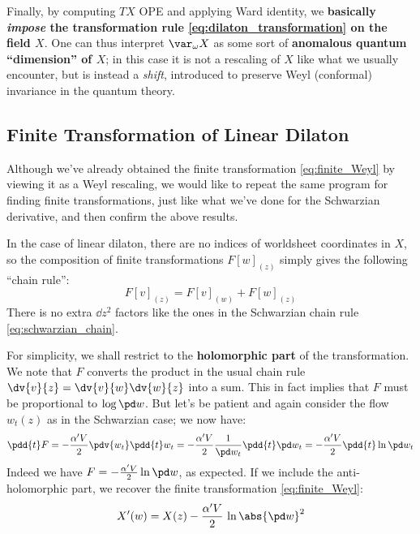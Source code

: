 \documentclass[a4paper
	,10pt
]{article}
\begin{document}
	Finally, by computing $TX$ OPE and applying Ward identity, we \textbf{basically \textit{impose} the transformation rule \eqref{eq:dilaton_transformation} on the field $X$}. One can thus interpret $\var_\omega X$ as some sort of \textbf{anomalous quantum ``dimension'' of $X$}; in this case it is not a rescaling of $X$ like what we usually encounter, but is instead a \textit{shift}, introduced to preserve Weyl (conformal) invariance in the quantum theory. 
	
\subsection{Finite Transformation of Linear Dilaton}
	Although we've already obtained the finite transformation \eqref{eq:finite_Weyl} by viewing it as a Weyl rescaling, we would like to repeat the same program for finding finite transformations, just like what we've done for the Schwarzian derivative, and then confirm the above results. 
	
	In the case of linear dilaton, there are no indices of worldsheet coordinates in $X$, so the composition of finite transformations $F[w]_{(z)}$ simply gives the following ``chain rule'':
	\begin{equation}
		F[v]_{(z)} = F[v]_{(w)} + F[w]_{(z)}
	\end{equation}
	There is no extra $\dd{z}^2$ factors like the ones in the Schwarzian chain rule \eqref{eq:schwarzian_chain}. 
	
	For simplicity, we shall restrict to the \textbf{holomorphic part} of the transformation.
	We note that $F$ converts the product in the usual chain rule $
		\dv{v}{z}
		= \dv{v}{w} \dv{w}{z} 
	$ into a sum. This in fact implies that $F$ must be proportional to $\log \pd w$. But let's be patient and again consider the flow $w_t(z)$ as in the Schwarzian case; we now have:
	\begin{equation}
		\pdd{t} F
		= - \frac{\alpha'V}{2}
				\pdv{w_t} \pdd{t} w_t
		= - \frac{\alpha'V}{2}
				\frac{1}{\pd w_t} \pdd{t} \pd w_t
		= - \frac{\alpha'V}{2}
				\pdd{t} \ln \pd w_t
	\end{equation}
	Indeed we have $
		F = - \frac{\alpha'V}{2} \ln \pd w
	$, as expected. If we include the anti-holomorphic part, we recover the finite transformation \eqref{eq:finite_Weyl}:
	\begin{equation}
		X'(w)
		= X(z) - \frac{\alpha' V}{2}\, \ln \abs{\pd w}^2
	\end{equation}
	
	
\raggedright
\printbibliography[%
	,heading = bibintoc
]
\end{document}
